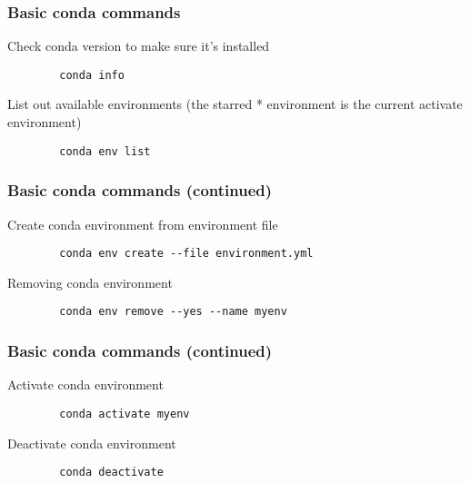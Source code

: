 \documentclass{beamer}
\begin{document}
	\begin{frame}[fragile]
	\frametitle{Basic conda commands}
	Check conda version to make sure it's installed
	\begin{exampleblock}{}
		\begin{verbatim}
		conda info
		\end{verbatim}
	\end{exampleblock}

	\vspace{0.5cm}

	List out available environments (the starred * environment is the current activate environment)
	\begin{exampleblock}{}
		\begin{verbatim}
		conda env list 
		\end{verbatim}
	\end{exampleblock}
	\end{frame}

	\begin{frame}[fragile]
	\frametitle{Basic conda commands (continued)}
	Create conda environment from environment file
	\begin{exampleblock}{}
		\begin{verbatim}
		conda env create --file environment.yml
		\end{verbatim}
	\end{exampleblock}

	\vspace{0.5cm}

	Removing conda environment
	\begin{exampleblock}{}
		\begin{verbatim}
		conda env remove --yes --name myenv
		\end{verbatim}
	\end{exampleblock}
	\end{frame}

	\begin{frame}[fragile]
	\frametitle{Basic conda commands (continued)}
	Activate conda environment
	\begin{exampleblock}{}
		\begin{verbatim}
		conda activate myenv
		\end{verbatim}
	\end{exampleblock}

	\vspace{0.5cm}

	Deactivate conda environment
	\begin{exampleblock}{}
		\begin{verbatim}
		conda deactivate
		\end{verbatim}
	\end{exampleblock}
	\end{frame}
\end{document}
